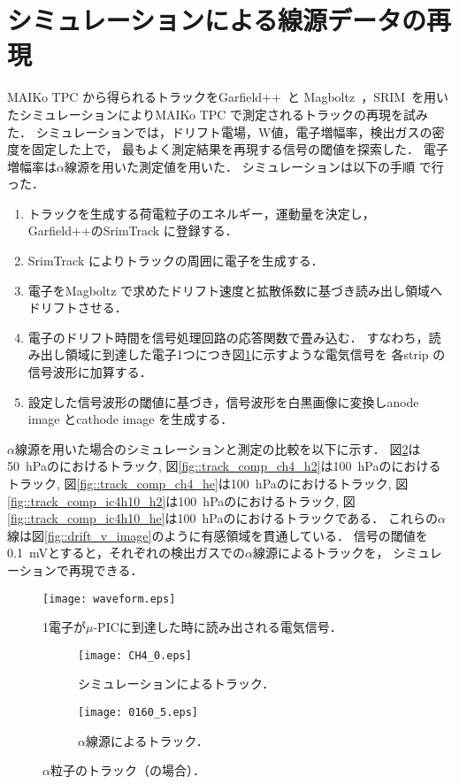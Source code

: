 \documentclass[../master]{subfiles}
\begin{document}
\section{シミュレーションによる線源データの再現}
MAIKo TPC から得られるトラックをGarfield++~\cite{garfield++}と
Magboltz~\cite{magboltz}，SRIM~\cite{SRIM}を用いたシミュレーションによりMAIKo TPC で測定されるトラックの再現を試みた．
シミュレーションでは，ドリフト電場，W値，電子増幅率，検出ガスの密度を固定した上で，
最もよく測定結果を再現する信号の閾値を探索した．
電子増幅率は$\alpha$線源を用いた測定値を用いた．
シミュレーションは以下の手順%
で行った．
\begin{enumerate}
\item\label{sim::particle_generate}
  トラックを生成する荷電粒子のエネルギー，運動量を決定し，
  Garfield++のSrimTrack に登録する．
\item
  SrimTrack によりトラックの周囲に電子を生成する．
\item
  電子をMagboltz で求めたドリフト速度と拡散係数に基づき読み出し領域へドリフトさせる．
\item
  電子のドリフト時間を信号処理回路の応答関数で畳み込む．
  すなわち，読み出し領域に到達した電子1つにつき図\ref{fig::mu-pic_readout}に示すような電気信号を
  各strip の信号波形に加算する．
\item
  設定した信号波形の閾値に基づき，信号波形を白黒画像に変換しanode image とcathode image を生成する．
\end{enumerate}
$\alpha$線源を用いた場合のシミュレーションと測定の比較を以下に示す．
図\ref{fig::track_comp_ch4}は\SI{50}{\hecto\pascal}の\Methane におけるトラック,
図\ref{fig::track_comp_ch4_h2}は\SI{100}{\hecto\pascal}の\MethaneHydro におけるトラック,
図\ref{fig::track_comp_ch4_he}は\SI{100}{\hecto\pascal}の\MethaneHerium におけるトラック, 
図\ref{fig::track_comp_ic4h10_h2}は\SI{100}{\hecto\pascal}の\isoButaneHydro におけるトラック,
図\ref{fig::track_comp_ic4h10_he}は\SI{100}{\hecto\pascal}の\isoButaneHerium におけるトラックである．
これらの$\alpha$線は図\ref{fig::drift_v_image}のように有感領域を貫通している．
信号の閾値を\SI{0.1}{\milli\volt}とすると，それぞれの検出ガスでの$\alpha$線源によるトラックを，
シミュレーションで再現できる．
\begin{figure}
  \centering
  \texttt{[image: waveform.eps]}
  \caption{1電子が$\mu$-PICに到達した時に読み出される電気信号．}
  \label{fig::mu-pic_readout}
\end{figure}

\begin{figure}
  \centering
  \begin{subfigure}{0.48\columnwidth}
    \centering
    \texttt{[image: CH4\_0.eps]}
    \caption{シミュレーションによるトラック．}
  \end{subfigure}
  \begin{subfigure}{0.48\columnwidth}
    \centering
    \texttt{[image: 0160\_5.eps]}
    \caption{$\alpha$線源によるトラック．}
  \end{subfigure}
  \caption{$\alpha$粒子のトラック（\Methane の場合）．}
  \label{fig::track_comp_ch4}
\end{figure}
\end{document}
